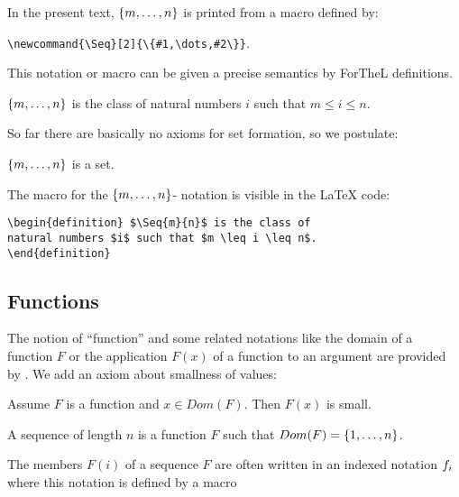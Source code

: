 \documentclass[11pt]{article}
\begin{document}
In the present text, $\Seq{m}{n}$ is printed from
a macro defined by:

\verb+\newcommand{\Seq}[2]{\{#1,\dots,#2\}}+.

This notation or macro can be given a precise semantics
by ForTheL definitions.

\begin{forthel}
\begin{definition} $\Seq{m}{n}$ is the class of
natural numbers $i$ such that $m \leq i \leq n$.
\end{definition}
\end{forthel}

So far there are basically no axioms for set formation, so
we postulate:
\begin{forthel}
\begin{axiom} $\Seq{m}{n}$ is a set. \end{axiom}

\end{forthel}

The macro for the $\Seq{m}{n}$- notation is visible in the \LaTeX
code:
\begin{verbatim}
\begin{definition} $\Seq{m}{n}$ is the class of
natural numbers $i$ such that $m \leq i \leq n$.
\end{definition}
\end{verbatim}

\subsection{Functions}

The notion of ``function'' and some related notations like the domain
of a function $F$ or the application $F(x)$ of a function
to an argument are provided by \Naproche{}.
We add an axiom about smallness of values:

\begin{forthel}

\begin{axiom}
Assume $F$ is a function and $x \in Dom(F)$. Then $F(x)$ is small.
\end{axiom}

\begin{definition} A sequence of length $n$ is a
function $F$ such that $Dom(F) = \Seq{1}{n}$.
\end{definition}

\end{forthel}

The members $F(i)$ of a sequence $F$ are often
written in an indexed notation $f_{i}$
where this notation is defined by a macro
\end{document}
